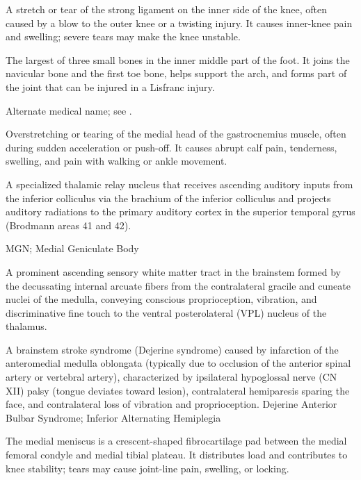  A stretch or tear of the strong ligament on the inner side of the knee, often caused by a blow to the outer knee or a twisting injury. It causes inner-knee pain and swelling; severe tears may make the knee unstable.

 The largest of three small bones in the inner middle part of the foot. It joins the navicular bone and the first toe bone, helps support the arch, and forms part of the joint that can be injured in a Lisfranc injury.

 Alternate medical name; see .

 Overstretching or tearing of the medial head of the gastrocnemius muscle, often during sudden acceleration or push-off. It causes abrupt calf pain, tenderness, swelling, and pain with walking or ankle movement.

 A specialized thalamic relay nucleus that receives ascending auditory inputs from the inferior colliculus via the brachium of the inferior colliculus and projects auditory radiations to the primary auditory cortex in the superior temporal gyrus (Brodmann areas 41 and 42).

\synonyms
MGN; Medial Geniculate Body

 A prominent ascending sensory white matter tract in the brainstem formed by the decussating internal arcuate fibers from the contralateral gracile and cuneate nuclei of the medulla, conveying conscious proprioception, vibration, and discriminative fine touch to the ventral posterolateral (VPL) nucleus of the thalamus.

 A brainstem stroke syndrome (Dejerine syndrome) caused by infarction of the anteromedial medulla oblongata (typically due to occlusion of the anterior spinal artery or vertebral artery), characterized by ipsilateral hypoglossal nerve (CN XII) palsy (tongue deviates toward lesion), contralateral hemiparesis sparing the face, and contralateral loss of vibration and proprioception.
\synonyms
Dejerine Anterior Bulbar Syndrome; Inferior Alternating Hemiplegia

 The medial meniscus is a crescent-shaped fibrocartilage pad between the medial femoral condyle and medial tibial plateau. It distributes load and contributes to knee stability; tears may cause joint-line pain, swelling, or locking.

